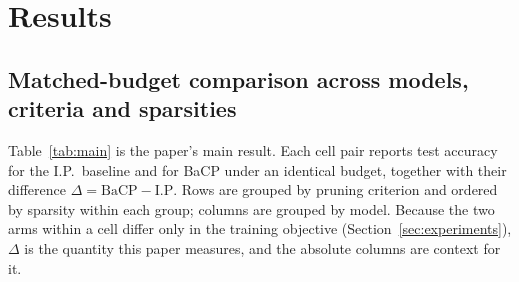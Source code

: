 \section{Results}
\label{sec:results}

\subsection{Matched-budget comparison across models, criteria and sparsities}

Table~\ref{tab:main} is the paper's main result. Each cell pair reports test
accuracy for the I.P.\ baseline and for BaCP under an identical budget, together
with their difference $\Delta = \mathrm{BaCP} - \mathrm{I.P.}$ Rows are grouped by
pruning criterion and ordered by sparsity within each group; columns are grouped
by model. Because the two arms within a cell differ only in the training
objective (Section~\ref{sec:experiments}), $\Delta$ is the quantity this paper
measures, and the absolute columns are context for it.

